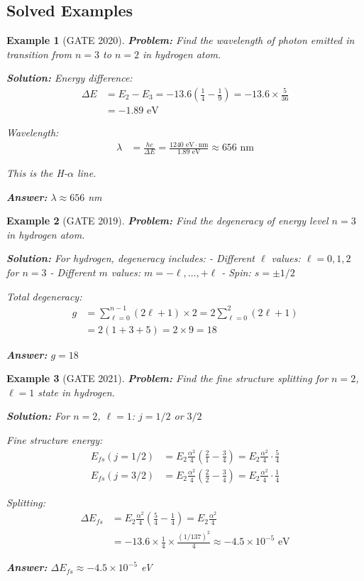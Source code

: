 \documentclass[12pt,a4paper]{article}
\newtheorem{example}{Example}[section]
\newcommand{\ans}[1]{\textcolor{red!70!black}{\textbf{Answer:} #1}}
\newcommand{\sol}{\textcolor{blue!70!black}{\textbf{Solution:}}}
\begin{document}
\subsection{Solved Examples}

\begin{example}[GATE 2020]
\textbf{Problem:} Find the wavelength of photon emitted in transition from $n=3$ to $n=2$ in hydrogen atom.

\sol
Energy difference:
\begin{align}
\Delta E &= E_2 - E_3 = -13.6\left(\frac{1}{4} - \frac{1}{9}\right) = -13.6 \times \frac{5}{36}\\
&= -1.89 \text{ eV}
\end{align}

Wavelength:
\begin{align}
\lambda &= \frac{hc}{\Delta E} = \frac{1240 \text{ eV}\cdot\text{nm}}{1.89 \text{ eV}} \approx 656 \text{ nm}
\end{align}

This is the H-$\alpha$ line.

\ans{$\lambda \approx 656$ nm}
\end{example}

\begin{example}[GATE 2019]
\textbf{Problem:} Find the degeneracy of energy level $n=3$ in hydrogen atom.

\sol
For hydrogen, degeneracy includes:
- Different $\ell$ values: $\ell = 0, 1, 2$ for $n=3$
- Different $m$ values: $m = -\ell, \ldots, +\ell$
- Spin: $s = \pm 1/2$

Total degeneracy:
\begin{align}
g &= \sum_{\ell=0}^{n-1} (2\ell+1) \times 2 = 2\sum_{\ell=0}^{2}(2\ell+1)\\
&= 2(1 + 3 + 5) = 2 \times 9 = 18
\end{align}

\ans{$g = 18$}
\end{example}

\begin{example}[GATE 2021]
\textbf{Problem:} Find the fine structure splitting for $n=2$, $\ell=1$ state in hydrogen.

\sol
For $n=2$, $\ell=1$: $j = 1/2$ or $3/2$

Fine structure energy:
\begin{align}
E_{fs}(j=1/2) &= E_2 \frac{\alpha^2}{4}\left(\frac{2}{1} - \frac{3}{4}\right) = E_2 \frac{\alpha^2}{4} \cdot \frac{5}{4}\\
E_{fs}(j=3/2) &= E_2 \frac{\alpha^2}{4}\left(\frac{2}{2} - \frac{3}{4}\right) = E_2 \frac{\alpha^2}{4} \cdot \frac{1}{4}
\end{align}

Splitting:
\begin{align}
\Delta E_{fs} &= E_2 \frac{\alpha^2}{4}\left(\frac{5}{4} - \frac{1}{4}\right) = E_2 \frac{\alpha^2}{4}\\
&= -13.6 \times \frac{1}{4} \times \frac{(1/137)^2}{4} \approx -4.5 \times 10^{-5} \text{ eV}
\end{align}

\ans{$\Delta E_{fs} \approx -4.5 \times 10^{-5}$ eV}
\end{example}
\end{document}
